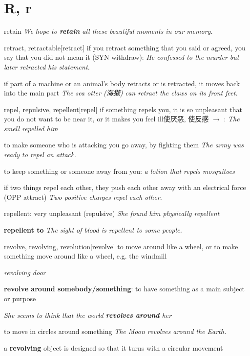 \section{R, r}

\begin{DefWord}{retain}
    \textit{We hope to \textbf{retain} all these beautiful moments in our memory.}
\end{DefWord}

\begin{DefWord}{retract, retractable}[retract]
    if you retract something that you said or agreed, you say that you did not mean it (SYN  withdraw):
    \textit{He confessed to the murder but later retracted his statement.}

    if part of a machine or an animal's body retracts or is retracted, it moves back into the main part
    \textit{The sea otter (海獭) can retract the claws on its front feet.}
\end{DefWord}

\begin{DefWord}{repel, repulsive, repellent}[repel]
    if something repels you, it is so unpleasant that you do not want to be near it, or it makes you feel ill使厌恶, 使反感 $\rightarrow$ :
    \textit{The smell repelled him}

    to make someone who is attacking you go away, by fighting them
    \textit{The army was ready to repel an attack.}

    to keep something or someone away from you:
    \textit{a lotion that repels mosquitoes}

    if two things repel each other, they push each other away with an electrical force (OPP attract)
    \textit{Two positive charges repel each other.}

    repellent: very unpleasant (repulsive)
    \textit{She found him physically repellent}

    \textbf{repellent to}
    \textit{The sight of blood is repellent to some people.}

\end{DefWord}

\begin{DefWord}{revolve, revolving, revolution}[revolve]
    to move around like a wheel, or to make something move around like a wheel, e.g. the windmill

    \textit{revolving door}

    \textbf{revolve around somebody/something}:
    to have something as a main subject or purpose
    
    \textit{She seems to think that the world \textbf{revolves around} her}

    to move in circles around something
    \textit{The Moon revolves around the Earth.}

    a \textbf{revolving} object is designed so that it turns with a circular movement

\end{DefWord}

